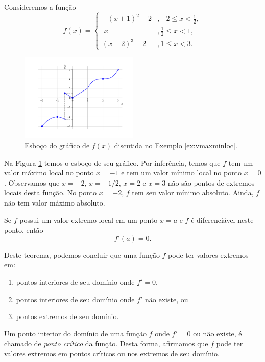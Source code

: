 \begin{ex}\label{ex:vmaxminloc}
  Consideremos a função
  \begin{equation}
    f(x) = \left\{
      \begin{array}{ll}
        -(x+1)^2-2 &, -2\leq x < \frac{1}{2},\\
        |x| &, \frac{1}{2} \leq x < 1,\\
        (x-2)^3+2 &, 1\leq x < 3.
      \end{array}
\right.
\end{equation}
  \begin{figure}[H]
    \centering
    \includegraphics[width=0.5\textwidth]{./cap_apderiv/dados/fig_ex_vmaxminloc/fig_f}
    \caption{Esboço do gráfico de $f(x)$ discutida no Exemplo \ref{ex:vmaxminloc}.}
    \label{fig:ex_vmaxminloc}
  \end{figure}
  
Na Figura \ref{fig:ex_vmaxminloc} temos o esboço de seu gráfico. Por inferência, temos que $f$ tem um valor máximo local no ponto $x=-1$ e tem um valor mínimo local no ponto $x=0$. Observamos que $x=-2$, $x=-1/2$, $x=2$ e $x=3$ não são pontos de extremos locais desta função. No ponto $x=-2$, $f$ tem seu valor mínimo absoluto. Ainda, $f$ não tem valor máximo absoluto.
\end{ex}

\begin{teo}
  Se $f$ possui um valor extremo local em um ponto $x=a$ e $f$ é diferenciável neste ponto, então
  \begin{equation}
    f'(a) = 0.
  \end{equation}
\end{teo}

Deste teorema, podemos concluir que uma função $f$ pode ter valores extremos em:
\begin{enumerate}
\item pontos interiores de seu domínio onde $f' = 0$,
\item pontos interiores de seu domínio onde $f'$ não existe, ou
\item pontos extremos de seu domínio.
\end{enumerate}
Um ponto interior do domínio de uma função $f$ onde $f'=0$ ou não existe, é chamado de \emph{ponto crítico} da função. Desta forma, afirmamos que $f$ pode ter valores extremos em pontos críticos ou nos extremos de seu domínio.

